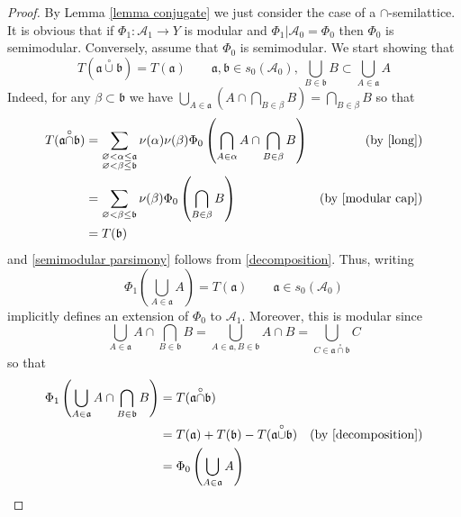 \documentclass[11pt]{amsart}
\theoremstyle{plain}
\begin{document}
\begin{proof} 
By Lemma \ref{lemma conjugate} we just consider the case of a $\cap$-semilattice.
It is obvious that if $\Phi_1:{\mathscr{A}}_1\to Y$ is modular and ${{\Phi_1}\vert {{\mathscr{A}}_0}}=\Phi_0$
then $\Phi_0$ is semimodular. Conversely, assume that $\Phi_0$ is semimodular. We 
start showing that
\begin{equation}
\label{semimodular parsimony}
T({\mathfrak a}{\overset\circ\cup}{\mathfrak b})=T({\mathfrak a})
\qquad 
{\mathfrak a},{\mathfrak b}\in s_0({\mathscr{A}}_0),\ \bigcup_{B\in{\mathfrak b}}B\subset\bigcup_{A\in{\mathfrak a}}A
\end{equation}
Indeed, for any $\beta\subset{\mathfrak b}$ we have $\bigcup_{A\in{\mathfrak a}}(A\cap\bigcap_{B\in\beta}B)=\bigcap_{B\in\beta}B$ so that 
\begin{align*}
T({\mathfrak a}{\overset\circ\cap}{\mathfrak b})
&=
\sum_{\substack{{\varnothing}<\alpha\le{\mathfrak a}\\ {\varnothing}<\beta\le{\mathfrak b}}}\nu(\alpha)\nu(\beta)
\Phi_0\left(\bigcap_{A\in\alpha}A\cap\bigcap_{B\in\beta}B\right)
&(\text{by }\eqref{long})\\
&=
\sum_{{\varnothing}<\beta\le{\mathfrak b}}\nu(\beta)\Phi_0\left(\bigcap_{B\in\beta}B\right)
&(\text{by }\eqref{modular cap})\\
&=
T({\mathfrak b})
\end{align*}
and \eqref{semimodular parsimony} follows from \eqref{decomposition}.
Thus, writing
\begin{equation} 
\label{k} 
\Phi_1\left(\bigcup_{A\in{\mathfrak a}}A\right)=T({\mathfrak a})
\qquad {\mathfrak a}\in s_0({\mathscr{A}}_0) 
\end{equation} 
implicitly defines an extension of $\Phi_0$ to ${\mathscr{A}}_1$. Moreover, this is 
modular since
\begin{equation*}
\bigcup_{A\in{\mathfrak a}}A\cap\bigcap_{B\in{\mathfrak b}}B
=
\bigcup_{A\in{\mathfrak a},B\in{\mathfrak b}}A\cap B
=
\bigcup_{C\in{\mathfrak a}{\overset\circ\cap}{\mathfrak b}}C
\end{equation*}
so that
\begin{align*}
\Phi_1\left(\bigcup_{A\in{\mathfrak a}}A\cap\bigcap_{B\in{\mathfrak b}}B\right)
&=
T({\mathfrak a}{\overset\circ\cap}{\mathfrak b})\\
&=
T({\mathfrak a})+T({\mathfrak b})-T({\mathfrak a}{\overset\circ\cup}{\mathfrak b})
&(\text{by }\eqref{decomposition})
\\
&=
\Phi_0\left(\bigcup_{A\in{\mathfrak a}}A\right)

\end{align*}
\end{proof}
\end{document}
